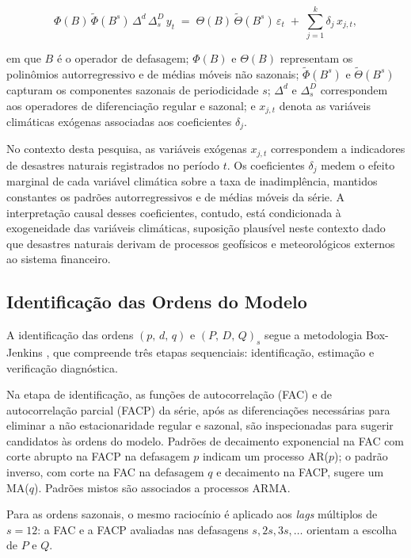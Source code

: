 \begin{equation}
  \Phi(B)\,\tilde{\Phi}(B^s)\,\Delta^d\,\Delta_s^D\,y_t
  \;=\;
  \Theta(B)\,\tilde{\Theta}(B^s)\,\varepsilon_t
  \;+\; \sum_{j=1}^{k} \delta_j\,x_{j,t},
  \label{eq:sarimax}
\end{equation}
 
\noindent
em que \(B\) é o operador de defasagem; \(\Phi(B)\) e \(\Theta(B)\) representam
os polinômios autorregressivo e de médias móveis não sazonais; \(\tilde{\Phi}(B^s)\)
e \(\tilde{\Theta}(B^s)\) capturam os componentes sazonais de periodicidade
\(s\); \(\Delta^d\) e \(\Delta_s^D\) correspondem aos operadores de
diferenciação regular e sazonal; e \(x_{j,t}\) denota as variáveis climáticas
exógenas associadas aos coeficientes \(\delta_j\).
 
No contexto desta pesquisa, as variáveis exógenas \(x_{j,t}\) correspondem
a indicadores de desastres naturais registrados no período \(t\). Os
coeficientes \(\delta_j\) medem o efeito marginal de cada variável climática
sobre a taxa de inadimplência, mantidos constantes os padrões autorregressivos
e de médias móveis da série. A interpretação causal desses coeficientes,
contudo, está condicionada à exogeneidade das variáveis climáticas, suposição
plausível neste contexto dado que desastres naturais derivam de processos
geofísicos e meteorológicos externos ao sistema financeiro.
 
\subsection{Identificação das Ordens do Modelo}
\label{sec:sarimax_id}
 
A identificação das ordens \((p,\,d,\,q)\) e \((P,\,D,\,Q)_s\) segue a
metodologia Box-Jenkins \citep{box2015}, que compreende três etapas
sequenciais: identificação, estimação e verificação diagnóstica.
 
Na etapa de identificação, as funções de autocorrelação (FAC) e de
autocorrelação parcial (FACP) da série, após as diferenciações necessárias
para eliminar a não estacionaridade regular e sazonal, são inspecionadas
para sugerir candidatos às ordens do modelo. Padrões de decaimento
exponencial na FAC com corte abrupto na FACP na defasagem \(p\) indicam
um processo AR(\(p\)); o padrão inverso, com corte na FAC na defasagem
\(q\) e decaimento na FACP, sugere um MA(\(q\)). Padrões mistos são
associados a processos ARMA.
 
Para as ordens sazonais, o mesmo raciocínio é aplicado aos \textit{lags}
múltiplos de \(s = 12\): a FAC e a FACP avaliadas nas defasagens \(s, 2s,
3s, \ldots\) orientam a escolha de \(P\) e \(Q\).
 
